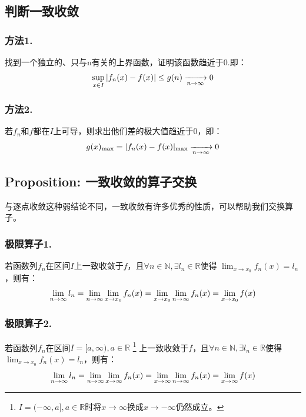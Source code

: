 \documentclass[12pt, a4paper, oneside]{ctexbook}
\begin{document}
  \subsection{判断一致收敛}
  \subsubsection{方法1.}
  找到一个独立的、只与n有关的上界函数，证明该函数趋近于0.即：
  \begin{equation}
    \notag
    \sup_{x\in I}| f_n(x)-f(x)|\leq g(n)\xrightarrow[n\rightarrow\infty]{}0   
  \end{equation}
  \subsubsection{方法2.}
  若$f_n$和$f$都在$I$上可导，则求出他们差的极大值趋近于0，即：
  \begin{equation}
    \notag
    g(x)_{\max}=|f_n(x)-f(x)|_{\max}\xrightarrow[n\rightarrow\infty]{}0   
  \end{equation}
  \subsection{Proposition: 一致收敛的算子交换}
  与逐点收敛这种弱结论不同，一致收敛有许多优秀的性质，可以帮助我们交换算子。
  \subsubsection{极限算子1.}
  若函数列$f_n$在区间$I$上一致收敛于$f$，且$\forall n\in\mathbb{N}, \exists l_n\in\mathbb{R}$使得
  $\lim_{x \to x_0}f_n(x)=l_n$，则有：
  \begin{equation}
    \notag
    \lim_{n \to \infty}l_n= \lim_{n \to \infty}\lim_{x \to x_0}f_n(x)
    =\lim_{x \to x_0}\lim_{n \to \infty}f_n(x)=\lim_{x \to x_0}f(x)   
  \end{equation}
  \subsubsection{极限算子2.}
  若函数列$f_n$在区间$I=[a,\infty), a\in\mathbb{R}$
    \footnote{$I=(-\infty,a], a\in\mathbb{R}$时将$x \to \infty$换成$x \to -\infty$仍然成立。}
  上一致收敛于$f$，且$\forall n\in\mathbb{N}, \exists l_n\in\mathbb{R}$使得
  $\lim_{x \to x_0}f_n(x)=l_n$，则有：
  \begin{equation}
    \notag
    \lim_{n \to \infty}l_n= \lim_{n \to \infty}\lim_{x \to \infty}f_n(x)
    =\lim_{x \to \infty}\lim_{n \to \infty}f_n(x)=\lim_{x \to \infty}f(x)   
  \end{equation}
\end{document}

